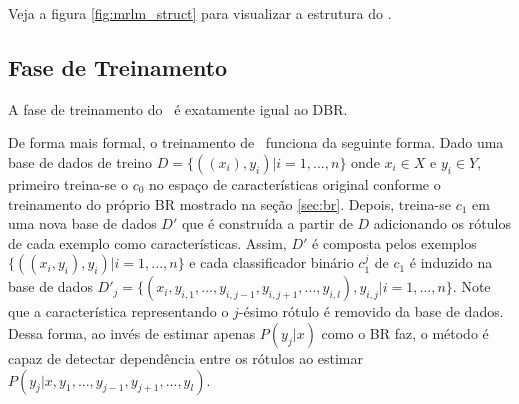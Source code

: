 \begin{itemize}
\end{itemize}
  
  Veja a figura \ref{fig:mrlm_struct} para visualizar a estrutura do \MRLMa. 
 
 
 \subsection{Fase de Treinamento}
  A fase de treinamento do \MRLMa~é exatamente igual ao DBR.
  
  De forma mais formal, o treinamento de \MRLM~funciona da seguinte forma.
  Dado uma base de dados de treino $D=\{((x_i),y_i)|i=1,...,n\}$ onde $x_i \in X$ e $y_i \in Y$,
  primeiro treina-se o $c_0$
  no espaço de características original conforme o treinamento do próprio BR mostrado na seção \ref{sec:br}.
  Depois, treina-se $c_1$ em uma nova base de dados $D'$ que é construída a partir de $D$ adicionando os rótulos de cada
  exemplo como características. Assim, $D'$ é composta pelos exemplos $\{((x_i,y_i),y_i) |i=1,...,n\}$ e
  cada classificador binário $c_1^j$ de $c_1$ é induzido na base de dados $D'_j=\{(x_i,y_{i,1},...,y_{i,j-1},y_{i,j+1},...,y_{i,l}),y_{i,j} | i=1,...,n\}$.
  Note que a característica representando o $j$-ésimo rótulo é removido da base de dados.
  Dessa forma, ao invés de estimar apenas $P(y_j|x)$ como o BR faz, o método é capaz de detectar dependência entre os rótulos ao
  estimar $P(y_j|x,y_1,...,y_{j-1},y_{j+1},...,y_l)$.
  
 
